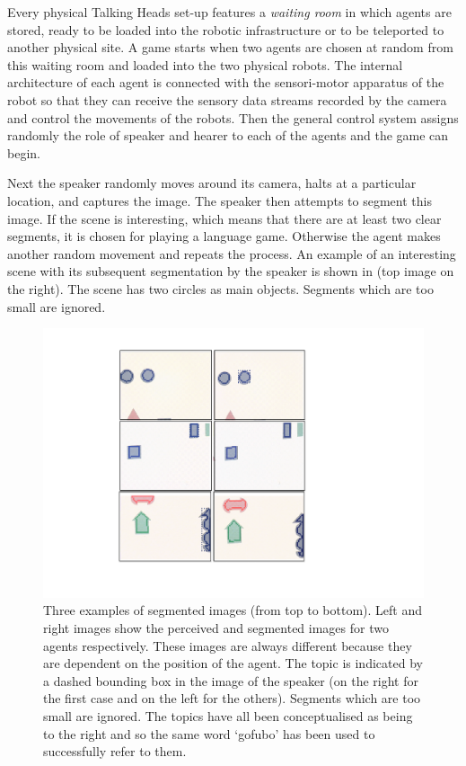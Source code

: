 Every physical Talking Heads set-up features a {\it waiting room} in 
which agents are stored, ready to be loaded into the 
robotic infrastructure or to be teleported to another
physical site. A game starts when two agents are chosen
at random from this waiting room and loaded into 
the two physical robots. The
internal architecture of each agent is connected with 
the sensori-motor apparatus of the robot so that they can 
receive the sensory data streams recorded by the camera
and control the movements of the robots. Then the general 
control system assigns randomly the role of speaker and hearer
to each of the agents and the game can begin. 

Next the speaker randomly moves around its camera, halts 
at a particular location, and captures
the image. The speaker then attempts to segment 
this image. If the scene is interesting, which means that
there are at least two clear segments, it is chosen 
for playing a language game. Otherwise the agent makes another 
random movement and repeats the process. An example of 
an interesting scene with its subsequent segmentation
by the speaker is shown in  (top image on the right). The scene
has two circles as main objects. Segments which are too 
small are ignored. 


\begin{figure}[htbp]
  \centerline{\includegraphics[width=.60\textwidth]{chap2/figs/hpos}}
\caption{ Three examples of segmented images (from top to bottom). Left and right images 
show the perceived and segmented images for two agents respectively. These images are always
different because they are dependent on the position of the agent. 
The topic is indicated by a dashed bounding box in the 
image of the speaker (on the right for the first case and on the left for the others). 
Segments which are too small are ignored. The topics have all been conceptualised
as being to the right and so the same word 
`gofubo' has been used to successfully refer to them.}
\label{f:plate10}
\end{figure}

